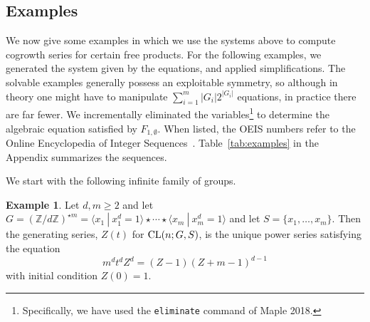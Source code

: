 \documentclass[11pt]{amsart}
\theoremstyle{definition}
\newtheorem{example}[theorem]{Example}
\begin{document}
\subsection{Examples}
\label{sec:exam}
We now give some examples in which we use the systems above to compute cogrowth series for certain free products.  For the following examples, we generated the system given by the
equations, and applied simplifications. The solvable examples
generally possess an exploitable symmetry, so although in theory one
might have to manipulate $\sum_{i=1}^m  |G_i|2^{|G_i|}$ equations, in
practice there are far fewer.  We incrementally eliminated the
variables\footnote{Specifically, we have used the {\tt eliminate} command of
  Maple 2018.} to determine the algebraic equation satisfied by
$F_{1,\emptyset}$. When listed, the OEIS numbers refer to the Online
Encyclopedia of Integer
Sequences~\cite{oeis}. Table~\ref{tab:examples} in the Appendix summarizes the sequences.

We start with the following infinite family of groups.
\begin{example}
\label{exam:1}
Let $d, m\ge 2$ and let $G=\left(\mathbb{Z}/d\mathbb{Z}\right)^{\star
  m}=\langle x_1~ |~x_1^d=1\rangle \star \cdots \star \langle x_m
~|~x_m^d=1\rangle$ and let $S=\{x_1,\ldots ,x_m\}$.  Then the
generating series, $Z(t)$ for ${\rm CL}(n;G,S)$, is the unique power
series satisfying the equation
\[m^d t^d Z^d = (Z-1)(Z+m-1)^{d-1}\] 
with initial condition $Z(0)=1$.
\end{example}
\end{document}
